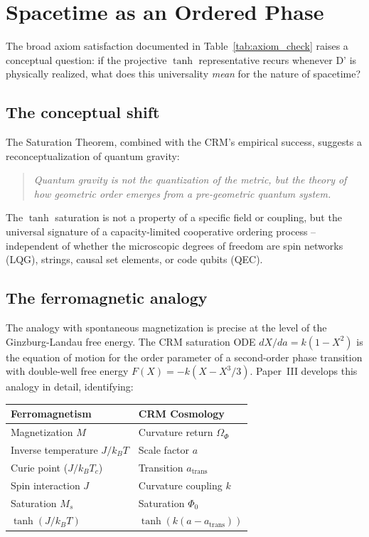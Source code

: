 \documentclass[aps,prd,twocolumn,superscriptaddress,nofootinbib]{revtex4-2}
\begin{document}
\section{Spacetime as an Ordered Phase}
\label{sec:ontology}

The broad axiom satisfaction documented in Table~\ref{tab:axiom_check} raises a conceptual question: if the projective $\tanh$ representative recurs whenever D' is physically realized, what does this universality \textit{mean} for the nature of spacetime?

\subsection{The conceptual shift}

The Saturation Theorem, combined with the CRM's empirical success, suggests a reconceptualization of quantum gravity:

\begin{quote}
\textit{Quantum gravity is not the quantization of the metric, but the theory of how geometric order emerges from a pre-geometric quantum system.}
\end{quote}

The $\tanh$ saturation is not a property of a specific field or coupling, but the universal signature of a capacity-limited cooperative ordering process -- independent of whether the microscopic degrees of freedom are spin networks (LQG), strings, causal set elements, or code qubits (QEC).

\subsection{The ferromagnetic analogy}

The analogy with spontaneous magnetization is precise at the level of the Ginzburg-Landau free energy. The CRM saturation ODE $dX/da = k(1 - X^2)$ is the equation of motion for the order parameter of a second-order phase transition with double-well free energy $F(X) = -k(X - X^3/3)$. Paper~III \cite{Geiger2026c} develops this analogy in detail, identifying:

\begin{center}
\begin{tabular}{ll}
\hline
Ferromagnetism & CRM Cosmology \\
\hline
Magnetization $M$ & Curvature return $\Omega_\Phi$ \\
Inverse temperature $J/k_BT$ & Scale factor $a$ \\
Curie point ($J/k_BT_c$) & Transition $a_{\mathrm{trans}}$ \\
Spin interaction $J$ & Curvature coupling $k$ \\
Saturation $M_s$ & Saturation $\Phi_0$ \\
$\tanh(J/k_BT)$ & $\tanh(k(a - a_{\mathrm{trans}}))$ \\
\hline
\end{tabular}
\end{center}
\end{document}
